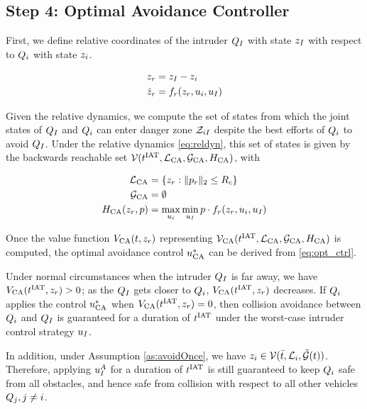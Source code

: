 \subsection{Step 4: Optimal Avoidance Controller}
First, we define relative coordinates of the intruder $Q_{I}$ with state $z_I$ with respect to $Q_{i}$ with state $z_i$.

\begin{equation}
\label{eq:reldyn}
\begin{aligned}
z_r &= z_I - z_i \\
\dot {z}_r &= f_r(z_r, u_i, u_I)
\end{aligned}
\end{equation}

Given the relative dynamics, we compute the set of states from which the joint states of $Q_{I}$ and $Q_{i}$ can enter danger zone $\mathcal{Z}_{iI}$ despite the best efforts of $Q_{i}$ to avoid $Q_{I}$. Under the relative dynamics \eqref{eq:reldyn}, this set of states is given by the backwards reachable set $\mathcal{V}(t^\text{IAT}, \mathcal{L}_\text{CA}, \mathcal{G}_\text{CA}, H_\text{CA})$, with

\begin{equation}
\begin{aligned}
\mathcal{L}_\text{CA} &= \{z_r: \|p_r\|_2 \le R_c\} \\
\mathcal{G}_\text{CA} &= \emptyset \\
H_\text{CA}(z_r, p) &= \max_{u_i} \min_{u_I} p \cdot f_r(z_r, u_i, u_I)
\end{aligned}
\end{equation}

Once the value function $V_\text{CA}(t, z_r)$ representing $\mathcal{V}_\text{CA}(t^\text{IAT}, \mathcal{L}_\text{CA}, \mathcal{G}_\text{CA}, H_\text{CA})$ is computed, the optimal avoidance control $u^*_\text{CA}$ can be derived from \eqref{eq:opt_ctrl}.

Under normal circumstances when the intruder $Q_{I}$ is far away, we have $V_\text{CA}(t^\text{IAT}, z_r) > 0$; as the $Q_{I}$ gets closer to $Q_{i}$, $V_\text{CA}(t^\text{IAT}, z_r)$ decreases. If $Q_{i}$ applies the control $u^*_\text{CA}$ when $V_\text{CA}(t^\text{IAT}, z_r) = 0$, then collision avoidance between $Q_{i}$ and $Q_{I}$ is guaranteed for a duration of $t^\text{IAT}$ under the worst-case intruder control strategy $u_I$.

In addition, under Assumption \ref{as:avoidOnce}, we have $z_i \in \mathcal{V}(\bar t, \mathcal{L}_i, \tilde{\mathcal{G}}(t))$. Therefore, applying $u_I^A$ for a duration of $t^\text{IAT}$ is still guaranteed to keep $Q_{i}$ safe from all obstacles, and hence safe from collision with respect to all other vehicles $Q_{j}, j \neq i$.